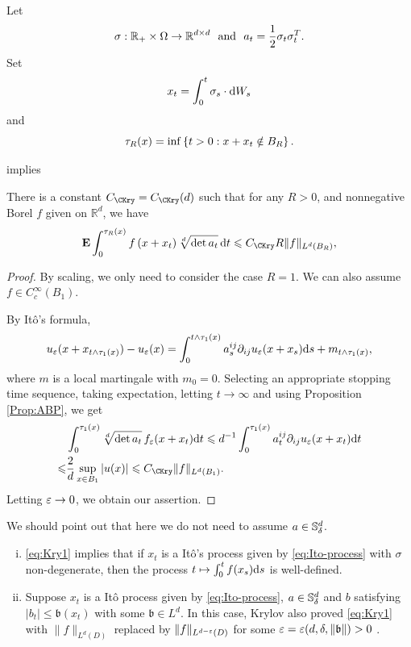 	
\medspace

Let 
\[
    \sigma: {\mathbb R}_+\times\Omega\to {\mathbb R}^{d\times d} ~\mbox{ and }~ a_t=\frac{1}{2} \sigma_t\sigma_t^{T}. 
\]
Set 
\begin{equation}\label{eq:Ito-process0}
    x_t= \int_0^t \sigma_s \cdot \text{\rm{d}} W_s
\end{equation}
and 
\[
    \tau_R(x)=\inf\left\{t>0: x+x_t\notin B_R \right\}. 
\]

 implies 
\const{\CKry}
\begin{theorem}\label{thm:Krylov1}
    There is a constant $C_\CKry=C_\CKry(d)$ such that for any $R>0$, and nonnegative Borel $f$ given on $\mathbb{R}^d$, we have
    \begin{equation}\label{eq:Kry1}
        \bE \int_0^{\tau_{R}(x)} f\left(x+x_t\right) \sqrt[d]{\operatorname{det} a_t} \, \d t \leq C_{\CKry} R\|f\|_{L^d\left(B_R\right)}, 
    \end{equation}
\end{theorem}
\begin{proof}
    By scaling, we only need to consider the case $R=1$. We can also assume $f\in C_c^\infty(B_1)$. 
    
    By It\^o's formula, 
        \begin{equation*}
            u_\varepsilon (x+x_{t\wedge \tau_1(x)})-u_\varepsilon(x) = \int_0^{t\wedge \tau_1(x)} a^{ij}_s \partial_{ij} u_\varepsilon(x+x_s) \text{\rm{d}} s + m_{t\wedge \tau_1(x)}, 
        \end{equation*}
      where \(m\) is a local martingale with \(m_0=0\). Selecting an appropriate stopping time sequence, taking expectation, letting $t\to\infty$ and using Proposition \ref{Prop:ABP}, we get 
      \begin{align*}
          &\int_0^{\tau_1(x)}\sqrt[d]{\det a_t} \, f_{\eps}(x+x_t) \d t  \leq d^{-1}\int_0^{\tau_1(x)} a^{ij}_t \p_{ij}u_\eps(x+x_t) \d t \\
          \leq& \frac{2}{d}\sup_{x\in B_{1}}|u(x)|\leq C_{\CKry} \|f\|_{L^d(B_1)}.
      \end{align*}
      Letting $\varepsilon\to0$, we obtain our assertion. 
    \end{proof}
	We should point out that here we do not need to assume $a\in {\mathbb S}_\delta^d$.  
	\begin{remark}
        \begin{enumerate}[(i)]
         \item \eqref{eq:Kry1} implies that if $x_t$ is a It\^o's process given by \eqref{eq:Ito-process} with $\sigma$ non-degenerate, then the process $t\mapsto \int_0^t f(x_s) \text{\rm{d}} s$ is well-defined. 
         \item Suppose $x_t$ is a It\^o process given by \eqref{eq:Ito-process}, $a\in {\mathbb S}^d_\delta$ and $b$ satisfying $|b_t|\leq \mathfrak{b}(x_t)$  with some $\mathfrak{b}\in L^d$.  In this case, Krylov \cite{krylov2021diffusion}  also proved \eqref{eq:Kry1}  with $\|f\|_{L^d(D)}$ replaced by $\|f\|_{L^{d-\varepsilon}(D)}$ for some $\varepsilon=\varepsilon(d, \delta, \|\mathfrak{b}\|)>0$ . 
       \end{enumerate}
	\end{remark}
	
